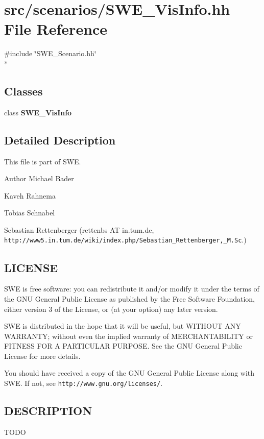 \section{src/scenarios/\-S\-W\-E\-\_\-\-Vis\-Info.hh File Reference}
\label{SWE__VisInfo_8hh}
{\ttfamily \#include \char`\"{}S\-W\-E\-\_\-\-Scenario.\-hh\char`\"{}}\\*
\subsection*{Classes}
\begin{DoxyCompactItemize}
\item 
class {\bf S\-W\-E\-\_\-\-Vis\-Info}
\end{DoxyCompactItemize}


\subsection{Detailed Description}
This file is part of S\-W\-E.

\begin{DoxyAuthor}{Author}
Michael Bader 

Kaveh Rahnema 

Tobias Schnabel 

Sebastian Rettenberger (rettenbs A\-T in.\-tum.\-de, {\tt http\-://www5.\-in.\-tum.\-de/wiki/index.\-php/\-Sebastian\-\_\-\-Rettenberger,\-\_\-\-M.\-Sc}.)
\end{DoxyAuthor}
\subsection{L\-I\-C\-E\-N\-S\-E}\label{Writer_8hh_LICENSE}
S\-W\-E is free software\-: you can redistribute it and/or modify it under the terms of the G\-N\-U General Public License as published by the Free Software Foundation, either version 3 of the License, or (at your option) any later version.

S\-W\-E is distributed in the hope that it will be useful, but W\-I\-T\-H\-O\-U\-T A\-N\-Y W\-A\-R\-R\-A\-N\-T\-Y; without even the implied warranty of M\-E\-R\-C\-H\-A\-N\-T\-A\-B\-I\-L\-I\-T\-Y or F\-I\-T\-N\-E\-S\-S F\-O\-R A P\-A\-R\-T\-I\-C\-U\-L\-A\-R P\-U\-R\-P\-O\-S\-E. See the G\-N\-U General Public License for more details.

You should have received a copy of the G\-N\-U General Public License along with S\-W\-E. If not, see {\tt http\-://www.\-gnu.\-org/licenses/}.\subsection{D\-E\-S\-C\-R\-I\-P\-T\-I\-O\-N}\label{NetCdfWriter_8hh_DESCRIPTION}
T\-O\-D\-O 